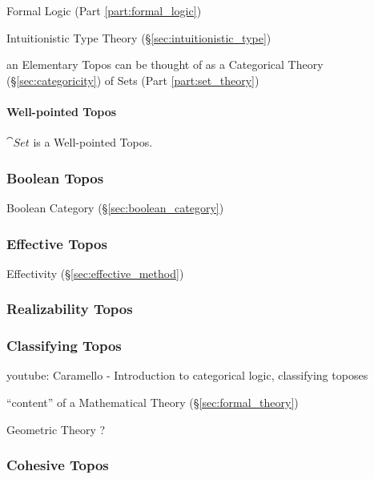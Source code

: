 Formal Logic (Part \ref{part:formal_logic})

Intuitionistic Type Theory (\S\ref{sec:intuitionistic_type})

an Elementary Topos can be thought of as a Categorical Theory
(\S\ref{sec:categoricity}) of Sets (Part \ref{part:set_theory})



\paragraph{Well-pointed Topos}\label{sec:wellpointed_topos}\hfill

$\cat{Set}$ is a Well-pointed Topos.



\subsubsection{Boolean Topos}\label{sec:boolean_topos}

Boolean Category (\S\ref{sec:boolean_category})



\subsubsection{Effective Topos}\label{sec:effective_topos}

Effectivity (\S\ref{sec:effective_method})



\subsubsection{Realizability Topos}\label{sec:realizability_topos}

\subsubsection{Classifying Topos}\label{sec:classifying_topos}

youtube: Caramello - Introduction to categorical logic, classifying
toposes

``content'' of a Mathematical Theory (\S\ref{sec:formal_theory})

Geometric Theory ?



\subsubsection{Cohesive Topos}\label{sec:cohesive_topos}

